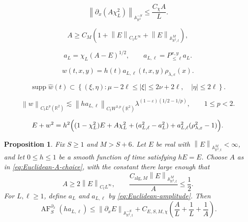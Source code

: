 \documentclass[10pt,a4paper]{amsart}
\newtheorem{proposition}{Proposition}
\newcommand{\A}{\mathbb A}
\newcommand{\R}{\mathbb R}
\newcommand{\abs}[1]{\left\lvert #1\right\rvert}
\newcommand{\eps}{\varepsilon}
\newcommand{\la}{\lambda}
\newcommand{\norm}[1]{\left\lVert #1\right\rVert}
\newcommand{\supp}{\operatorname{supp}}
\begin{document}
\begin{equation}\label{eq:localized-constant-scaling}
    \norm{\partial_x(A\chi_L^2)}_{\A^{-S}_{\R^2}}
      \leq \frac{C_\chi A}{L}.
\end{equation}

\begin{equation}\label{eq:Euclidean-A-choice}
    A\geq C_M\left(1+\norm{E}_{C_tL^\infty}
                    +\norm{E}_{\A^M_{\R^2,t}}\right),
\end{equation}

\begin{equation}\label{eq:Euclidean-amplitude}
    a_L=\chi_L(A-E)^{1/2},
    \qquad a_{L,\ell}=P_{\leq\ell}^{x,y}a_L.
\end{equation}

\begin{equation}\label{eq:Euclidean-increment}
    w(t,x,y)=h(t)a_{L,\ell}(t,x,y)\rho_{\la,\eps}(x).
\end{equation}

\begin{equation}\label{eq:Euclidean-cone}
    \supp\widehat w(t)\subset
    \left\{(\xi,\eta):
       \mu-2\ell\leq\abs\xi\leq2\nu+2\ell,
       \quad \abs\eta\leq2\ell
    \right\}.
\end{equation}

\begin{equation}\label{eq:Euclidean-Lp}
    \norm{w}_{C_tL^p(\R^2)}
    \lesssim
    \norm{h a_{L,\ell}}_{C_tW^{3,p}(\R^2)}
    \la^{(1-\eps)(1/2-1/p)},
    \qquad 1\leq p<2.
\end{equation}

\begin{equation}\label{eq:Euclidean-cancellation}
 E+w^2=h^2\Bigl((1-\chi_L^2)E+A\chi_L^2
 +(a_{L,\ell}^2-a_L^2)+a_{L,\ell}^2(\rho_{\la,\eps}^2-1)\Bigr).
\end{equation}

\begin{proposition}
\label{prop:Euclidean-amplitude-exact-coefficient}
Fix $S\geq1$ and $M>S+6$.  Let $E$ be real with
$\norm{E}_{\A^M_{\R^2,t}}<\infty$, and let $0\leq h\leq1$ be a smooth
function of time satisfying $hE=E$.  Choose $A$ as in
\eqref{eq:Euclidean-A-choice}, with the constant there large enough that
\begin{equation}\label{eq:Euclidean-amplitude-smallness}
   A\geq2\norm E_{C_tL^\infty},
   \qquad
   \frac{C_{\mathrm{alg},M}\norm E_{\A^M_{\R^2,t}}}{A}\leq\frac12.
\end{equation}
For $L,\ell\geq1$, define $a_L$ and $a_{L,\ell}$ by
\eqref{eq:Euclidean-amplitude}.  Then
\begin{equation}\label{eq:Euclidean-amplitude-exact-coefficient}
   \operatorname{AF}^{\partial_x}_S(h a_{L,\ell})
   \leq
   \norm{\partial_xE}_{\A^{-S}_{\R^2,t}}
   +C_{E,S,M,\chi}
      \left(\frac{A}{L}+\frac1L+\frac1A\right).
\end{equation}
\end{proposition}
\end{document}
